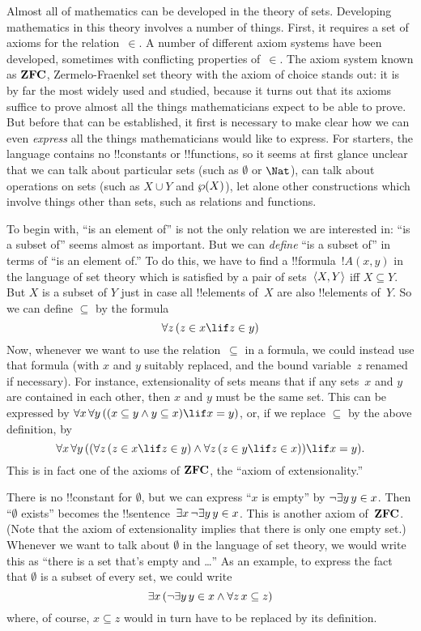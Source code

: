 \documentclass[../../../include/open-logic-section]{subfiles}
\begin{document}


Almost all of mathematics can be developed in the theory of sets.
Developing mathematics in this theory involves a number of things.
First, it requires a set of axioms for the relation~$\in$.  A number
of different axiom systems have been developed, sometimes with
conflicting properties of~$\in$.  The axiom system known as
$\mathbf{ZFC}$, Zermelo-Fraenkel set theory with the axiom of choice
stands out: it is by far the most widely used and studied, because it
turns out that its axioms suffice to prove almost all the things
mathematicians expect to be able to prove.  But before that can be
established, it first is necessary to make clear how we can even
\emph{express} all the things mathematicians would like to express.
For starters, the language contains no !!{constant}s or !!{function}s,
so it seems at first glance unclear that we can talk about particular
sets (such as $\emptyset$ or $\Nat$), can talk about operations on
sets (such as $X \cup Y$ and $\wp(X)$), let alone other
constructions which involve things other than sets, such as relations
and functions.

To begin with, ``is an element of'' is not the only relation we are
interested in: ``is a subset of'' seems almost as important.  But we
can \emph{define} ``is a subset of'' in terms of ``is an element of.''
To do this, we have to find a !!{formula}~$!A(x, y)$ in
the language of set theory which is satisfied by a pair of
sets~$\langle X, Y \rangle$ iff $X \subseteq Y$.  But $X$ is a subset of $Y$
just in case all !!{element}s of~$X$ are also !!{element}s of~$Y$.  So
we can define $\subseteq$ by the formula
\[
\lforall[z][(z \in x \lif z \in y)]
\]
Now, whenever we want to use the relation~$\subseteq$ in a formula, we
could instead use that formula (with $x$ and $y$ suitably replaced,
and the bound variable~$z$ renamed if necessary).  For instance,
extensionality of sets means that if any sets~$x$ and $y$ are
contained in each other, then $x$ and $y$ must be the same set. This
can be expressed by $\lforall[x][\lforall[y][((x \subseteq y \land y
    \subseteq x) \lif x = y)]]$, or, if we replace $\subseteq$ by the
above definition, by
\[
\lforall[x][\lforall[y][((\lforall[z][(z \in x \lif z \in y)] \land
    \lforall[z][(z \in y \lif z \in x)]) \lif x = y)]].
\]
This is in fact one of the axioms of $\mathbf{ZFC}$, the ``axiom of
extensionality.''

There is no !!{constant} for $\emptyset$, but we can express ``$x$ is
empty'' by $\lnot \lexists[y][y \in x]$.  Then ``$\emptyset$ exists''
becomes the !!{sentence}~$\lexists[x][\lnot \lexists[y][y \in
    x]]$. This is another axiom of~$\mathbf{ZFC}$.  (Note that the axiom
of extensionality implies that there is only one empty set.)  Whenever
we want to talk about $\emptyset$ in the language of set theory, we
would write this as ``there is a set that's empty and \dots'' As an
example, to express the fact that $\emptyset$ is a subset of every
set, we could write
\[
\lexists[x][(\lnot\lexists[y][y \in x] \land \lforall[z][x \subseteq
    z])]
\]
where, of course, $x \subseteq z$ would in turn have to be replaced by
its definition.
\end{document}
